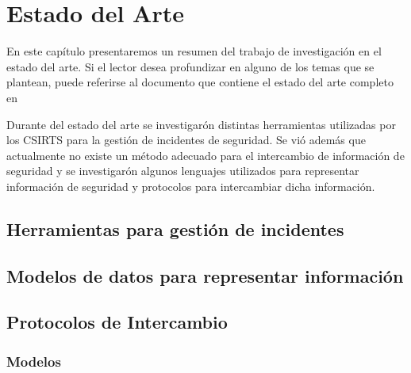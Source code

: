 \chapter{Estado del Arte}
\label{capitulo2}

%

En este capítulo presentaremos un resumen del trabajo de investigación en el estado del arte. Si el lector desea profundizar en alguno de los temas que se plantean, puede referirse al documento que contiene el estado del arte completo en \cite{AdvancedThreatsCollaboration}

Durante del estado del arte se investigarón distintas herramientas utilizadas por los CSIRTS para la gestión de incidentes de seguridad. Se vió además que actualmente no existe un método adecuado para el intercambio de información de seguridad y se investigarón algunos lenguajes utilizados para representar información de seguridad y protocolos para intercambiar dicha información.

\section{Herramientas para gestión de incidentes}
\label{herramientas}


\section{Modelos de datos para representar información}
\label{modelodedatos}



%



\section{Protocolos de Intercambio}
\label{protocolos}
 
 
\subsection{Modelos}
\label{modelos}
 
